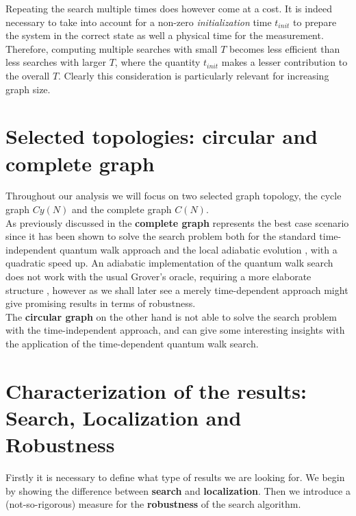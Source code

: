         Repeating the search multiple times does however come at a cost. It is indeed necessary to take into account for a non-zero \textit{initialization} time $t_{init}$ to prepare the system in the correct state as well a physical time for the measurement. Therefore, computing multiple searches with small $T$ becomes less efficient than less searches with larger $T$, where the quantity $t_{init}$ makes a lesser contribution to the overall $T$. Clearly this consideration is particularly relevant for increasing graph size.

\section{Selected topologies: circular and complete graph}
    Throughout our analysis we will focus on two selected graph topology, the cycle graph $Cy(N)$ and the complete graph $C(N)$. \\

    As previously discussed in  the \textbf{complete graph} represents the best case scenario since it has been shown to solve the search problem both for the standard time-independent quantum walk approach \cite{Childs2004} and the local adiabatic evolution \cite{Roland2002}, with a quadratic speed up. An adiabatic implementation of the quantum walk search does not work with the usual Grover's oracle, requiring a more elaborate structure \cite{Wong2016}, however as we shall later see a merely time-dependent approach might give promising results in terms of robustness.  \\

    The \textbf{circular graph} on the other hand is not able to solve the search problem with the time-independent approach, and can give some interesting insights with the application of the time-dependent quantum walk search.  \\


\section{Characterization of the results: Search, Localization and Robustness}
    Firstly it is necessary to define what type of results we are looking for. We begin by showing the difference between \textbf{search} and \textbf{localization}. Then we introduce a (not-so-rigorous) measure for the \textbf{robustness} of the search algorithm.

